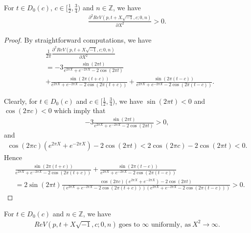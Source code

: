 \documentclass[12pt]{amsart}
\begin{document}
  

\begin{lemma} \label{lemma-1-dim-hess}
    For $t\in D_0(c)$, $c\in [\frac{1}{2},\frac{3}{4})$ and $n\in \mathbb{Z}$, we have 
    \begin{align}
        \frac{\partial^2 ReV(p,t+X\sqrt{-1},c;0,n)}{\partial X^2}>0.
    \end{align}
\end{lemma}
\begin{proof}
By straightforward computations,  we have
\begin{align}
&\frac{1}{2\pi}\frac{\partial^2 ReV(p,t+X\sqrt{-1},c;0,n)}{\partial X^2}\\\nonumber
&=-3\frac{\sin(2\pi t)}{e^{2\pi X}+e^{-2\pi X}-2\cos(2\pi t)}\\\nonumber
&+\frac{\sin(2\pi (t+c))}{e^{2\pi X}+e^{-2\pi X}-2\cos(2\pi (t+c))}+\frac{\sin(2\pi (t-c))}{e^{2\pi X}+e^{-2\pi X}-2\cos(2\pi (t-c))}.
\end{align}

Clearly, for $t\in D_0(c)$ and $c\in [\frac{1}{2},\frac{3}{4})$, we have $\sin(2\pi t)<0$ and $\cos(2\pi c)<0$ which imply that 
\begin{align}
 -3\frac{\sin(2\pi t)}{e^{2\pi X}+e^{-2\pi X}-2\cos(2\pi t)}>0,   
\end{align}
and 
\begin{align}
    \cos(2\pi c)(e^{2\pi X}+e^{-2\pi X})-2\cos(2\pi t)<2\cos(2\pi c)-2\cos(2\pi t)<0.
\end{align}
Hence
\begin{align}
    &\frac{\sin(2\pi (t+c))}{e^{2\pi X}+e^{-2\pi X}-2\cos(2\pi (t+c))}+\frac{\sin(2\pi (t-c))}{e^{2\pi X}+e^{-2\pi X}-2\cos(2\pi (t-c))}\\\nonumber
    &=2\sin(2\pi t)\frac{\cos(2\pi c)(e^{2\pi X}+e^{-2\pi X})-2\cos(2\pi t)}{(e^{2\pi X}+e^{-2\pi X}-2\cos(2\pi (t+c)))(e^{2\pi X}+e^{-2\pi X}-2\cos(2\pi (t-c)))}>0.
\end{align}
\end{proof}
\begin{lemma} \label{lemma-1-dim-finfty}
    For $t\in D_0(c)$ and $n\in \mathbb{Z}$, we have 
    \begin{align} \label{formula-f-infty}
        ReV(p,t+X\sqrt{-1},c;0,n)\ \text{goes to $\infty$ uniformly}, \ \text{as} \ X^2\rightarrow \infty. 
    \end{align}
\end{lemma}
\end{document}
